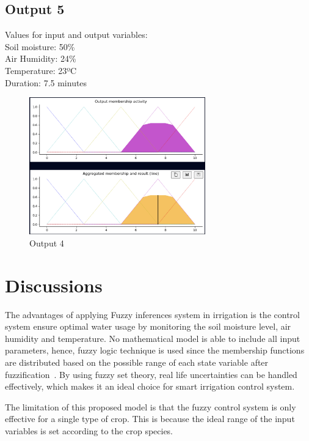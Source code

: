 \documentclass[conference]{IEEEtran}
\begin{document}
\subsection{Output 5}
Values for input and output variables: \\
Soil moisture: 50\% \\
Air Humidity: 24\% \\
Temperature: 23ºC \\
Duration: 7.5  minutes 
\begin{figure}[!ht]
    \centering
     \includegraphics[width=3in]{graphs/50_24_23.png}
     \caption{Output 4} 
\end{figure}



\section{Discussions}
The advantages of applying Fuzzy inferences system in irrigation is the control system ensure optimal water usage by monitoring the soil moisture level, air humidity and temperature. No mathematical model is able to include all input parameters, hence, fuzzy logic technique is used since the membership functions are distributed based on the possible range of each state variable after fuzzification~\cite{truneh2018fuzzy}. By using fuzzy set theory, real life uncertainties can be handled effectively, which makes it an ideal choice for smart irrigation control system.

The limitation of this proposed model is that the fuzzy control system is only effective for a single type of crop. This is because the ideal range of the input variables is set according to the crop species.



\vspace{20pt}

\medskip

\printbibliography
\end{document}

